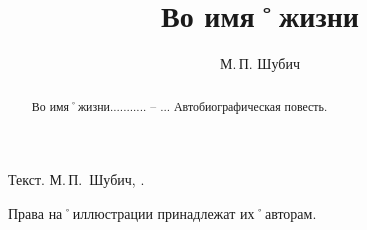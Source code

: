 ﻿%
\title{\huge\bf Во имя˚жизни}										%
\author{\LARGE М.\,П. Шубич}											%

\maketitle																			%


\abstractstyle{\footnotesize}
{\item Текст. М.\,П.~Шубич, \theyear.\\ 
\item Права на˚иллюстрации принадлежат их˚авторам.}

\begin {abstract}
	 {Во имя˚жизни........... \--- ...}
	Автобиографическая повесть.
\end{abstract}


\setcounter{page}{3}										%
